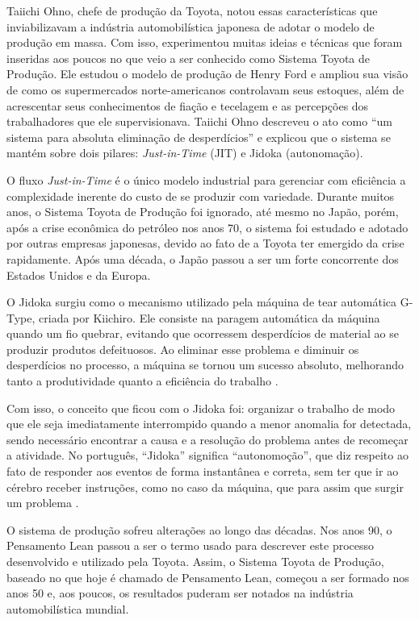 Taiichi Ohno, chefe de produção da Toyota, notou essas características que inviabilizavam a indústria automobilística japonesa de adotar o modelo de produção em massa. Com isso, experimentou muitas ideias e técnicas que foram inseridas aos poucos no que veio a ser conhecido como Sistema Toyota de Produção. Ele estudou o modelo de produção de Henry Ford e ampliou sua visão de como os supermercados norte-americanos controlavam seus estoques, além de acrescentar seus conhecimentos de fiação e tecelagem e as percepções dos trabalhadores que ele supervisionava. Taiichi Ohno descreveu o ato como “um sistema para absoluta eliminação de desperdícios” e explicou que o sistema se mantém sobre dois pilares: \textit{Just-in-Time} (JIT) e Jidoka (autonomação). 

O fluxo \textit{Just-in-Time} é o único modelo industrial para gerenciar com eficiência a complexidade inerente do custo de se produzir com variedade. Durante muitos anos, o Sistema Toyota de Produção foi ignorado, até mesmo no Japão, porém, após a crise econômica do petróleo nos anos 70, o sistema foi estudado e adotado por outras empresas japonesas, devido ao fato de a Toyota ter emergido da crise rapidamente. Após uma década, o Japão passou a ser um forte concorrente dos Estados Unidos e da Europa.

O Jidoka surgiu como o mecanismo utilizado pela máquina de tear automática G-Type, criada por Kiichiro. Ele consiste na paragem automática da máquina quando um fio quebrar, evitando que ocorressem desperdícios de material ao se produzir produtos defeituosos. Ao eliminar esse problema e diminuir os desperdícios no processo, a máquina se tornou um sucesso absoluto, melhorando tanto a produtividade quanto a eficiência do trabalho \cite{katayama2010}. 

Com isso, o conceito que ficou com o Jidoka foi: organizar o trabalho de modo que ele seja imediatamente interrompido quando a menor anomalia for detectada, sendo necessário encontrar a causa e a resolução do problema antes de recomeçar a atividade. No português, “Jidoka” significa “autonomoção”, que diz respeito ao fato de responder aos eventos de forma instantânea e correta, sem ter que ir ao cérebro receber instruções, como no caso da máquina, que para assim que surgir um problema \cite{poppendieck}. 

O sistema de produção sofreu alterações ao longo das décadas. Nos anos 90, o Pensamento Lean passou a ser o termo usado para descrever este processo desenvolvido e utilizado pela Toyota. Assim, o Sistema Toyota de Produção, baseado no que hoje é chamado de Pensamento Lean, começou a ser formado nos anos 50 e, aos poucos, os resultados puderam ser notados na indústria automobilística mundial. 

